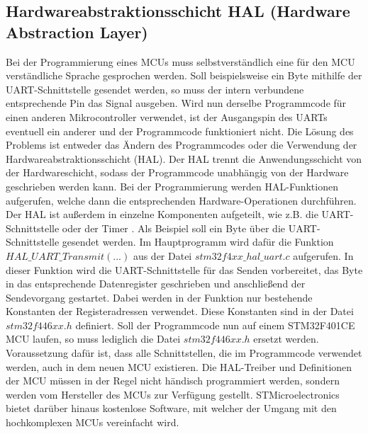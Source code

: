 \subsection{Hardwareabstraktionsschicht HAL (Hardware Abstraction Layer)}
Bei der Programmierung eines MCUs muss selbstverständlich eine für den MCU verständliche Sprache gesprochen werden. Soll beispielsweise ein Byte mithilfe der UART-Schnittstelle gesendet werden, so muss der intern verbundene entsprechende Pin das Signal ausgeben. Wird nun derselbe Programmcode für einen anderen Mikrocontroller verwendet, ist der Ausgangspin des UARTs eventuell ein anderer und der Programmcode funktioniert nicht. Die Lösung des Problems ist entweder das Ändern des Programmcodes oder die Verwendung der Hardwareabstraktionsschicht (HAL). Der HAL trennt die Anwendungsschicht von der Hardwareschicht, sodass der Programmcode unabhängig von der Hardware geschrieben werden kann. Bei der Programmierung werden HAL-Funktionen aufgerufen, welche dann die entsprechenden Hardware-Operationen durchführen. Der HAL ist außerdem in einzelne Komponenten aufgeteilt, wie z.B. die UART-Schnittstelle oder der Timer \cite[S.77 ff.]{IoTSystems}. Als Beispiel soll ein Byte über die UART-Schnittstelle gesendet werden. Im Hauptprogramm wird dafür die Funktion $HAL\_UART\_Transmit(...)$ aus der Datei $stm32f4xx\_hal\_uart.c$ aufgerufen. In dieser Funktion wird die UART-Schnittstelle für das Senden vorbereitet, das Byte in das entsprechende Datenregister geschrieben und anschließend der Sendevorgang gestartet. Dabei werden in der Funktion nur bestehende Konstanten der Registeradressen verwendet. Diese Konstanten sind in der Datei $stm32f446xx.h$ definiert. Soll der Programmcode nun auf einem STM32F401CE MCU laufen, so muss lediglich die Datei $stm32f446xx.h$ ersetzt werden. Voraussetzung dafür ist, dass alle Schnittstellen, die im Programmcode verwendet werden, auch in dem neuen MCU existieren. Die HAL-Treiber und Definitionen der MCU müssen in der Regel nicht händisch programmiert werden, sondern werden vom Hersteller des MCUs zur Verfügung gestellt. STMicroelectronics bietet darüber hinaus kostenlose Software, mit welcher der Umgang mit den hochkomplexen MCUs vereinfacht wird.